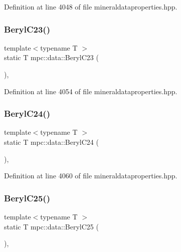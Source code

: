 Definition at line 4048 of file mineraldataproperties.\+hpp.

\mbox{\label{namespacempc_1_1data_aaea99063c6b69744b1330d8796095bca}} 
\subsubsection{\texorpdfstring{Beryl\+C23()}{BerylC23()}}
{\footnotesize\ttfamily template$<$typename T $>$ \\
static T mpc\+::data\+::\+Beryl\+C23 (\begin{DoxyParamCaption}{ }\end{DoxyParamCaption})\hspace{0.3cm}{\ttfamily [inline]}, {\ttfamily [static]}}



Definition at line 4054 of file mineraldataproperties.\+hpp.

\mbox{\label{namespacempc_1_1data_a988b0e58087ff3e8aa326d468b377d34}} 
\subsubsection{\texorpdfstring{Beryl\+C24()}{BerylC24()}}
{\footnotesize\ttfamily template$<$typename T $>$ \\
static T mpc\+::data\+::\+Beryl\+C24 (\begin{DoxyParamCaption}{ }\end{DoxyParamCaption})\hspace{0.3cm}{\ttfamily [inline]}, {\ttfamily [static]}}



Definition at line 4060 of file mineraldataproperties.\+hpp.

\mbox{\label{namespacempc_1_1data_a0519acea7ad38ae344434269dc4b4986}} 
\subsubsection{\texorpdfstring{Beryl\+C25()}{BerylC25()}}
{\footnotesize\ttfamily template$<$typename T $>$ \\
static T mpc\+::data\+::\+Beryl\+C25 (\begin{DoxyParamCaption}{ }\end{DoxyParamCaption})\hspace{0.3cm}{\ttfamily [inline]}, {\ttfamily [static]}}



